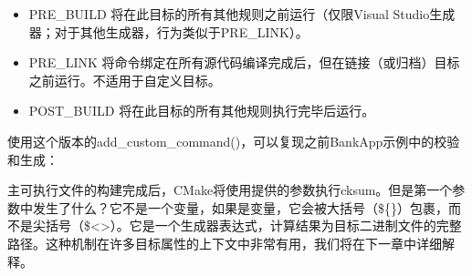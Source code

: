 \begin{itemize}
\item
PRE\_BUILD 将在此目标的所有其他规则之前运行（仅限Visual Studio生成器；对于其他生成器，行为类似于PRE\_LINK）。

\item
PRE\_LINK 将命令绑定在所有源代码编译完成后，但在链接（或归档）目标之前运行。不适用于自定义目标。

\item
POST\_BUILD 将在此目标的所有其他规则执行完毕后运行。
\end{itemize}

使用这个版本的add\_custom\_command()，可以复现之前BankApp示例中的校验和生成：



主可执行文件的构建完成后，CMake将使用提供的参数执行cksum。但是第一个参数中发生了什么？它不是一个变量，如果是变量，它会被大括号（\$\{\}）包裹，而不是尖括号（\$<>）。它是一个生成器表达式，计算结果为目标二进制文件的完整路径。这种机制在许多目标属性的上下文中非常有用，我们将在下一章中详细解释。


























